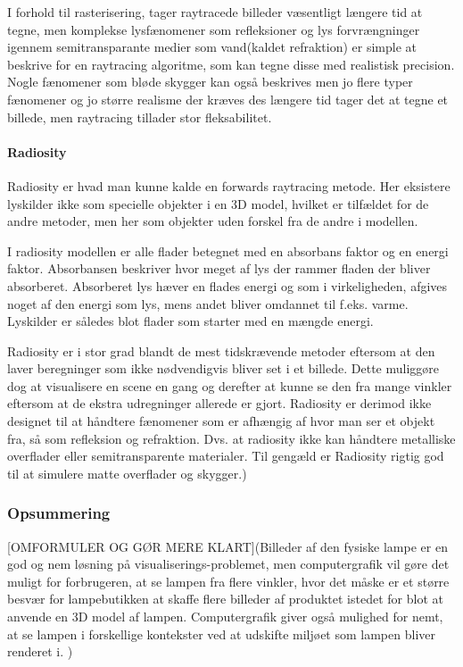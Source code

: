 I forhold til rasterisering, tager raytracede billeder væsentligt længere tid at tegne, men komplekse lysfænomener som refleksioner og lys forvrængninger igennem semitransparante medier som vand(kaldet refraktion) er simple at beskrive for en raytracing algoritme, som kan tegne disse med realistisk precision. Nogle fænomener som bløde skygger kan også beskrives men jo flere typer fænomener og jo større realisme der kræves des længere tid tager det at tegne et billede, men raytracing tillader stor fleksabilitet.

\paragraph{Radiosity \cite{radiosity_by_wpi,radiosity_by_uob}}
Radiosity er hvad man kunne kalde en forwards raytracing metode. Her eksistere lyskilder ikke som specielle objekter i en 3D model, hvilket er tilfældet for de andre metoder, men her som objekter uden forskel fra de andre i modellen.

I radiosity modellen er alle flader betegnet med en absorbans faktor og en energi faktor. Absorbansen beskriver hvor meget af lys der rammer fladen der bliver absorberet. Absorberet lys hæver en flades energi og som i virkeligheden, afgives noget af den energi som lys, mens andet bliver omdannet til f.eks. varme. Lyskilder er således blot flader som starter med en mængde energi.

Radiosity er i stor grad blandt de mest tidskrævende metoder eftersom at den laver beregninger som ikke nødvendigvis bliver set i et billede. Dette muliggøre dog at visualisere en scene en gang og derefter at kunne se den fra mange vinkler eftersom at de ekstra udregninger allerede er gjort. Radiosity er derimod ikke designet til at håndtere fænomener som er afhængig af hvor man ser et objekt fra, så som refleksion og refraktion. Dvs. at radiosity ikke kan håndtere metalliske overflader eller semitransparente materialer. Til gengæld er Radiosity rigtig god til at simulere matte overflader og skygger.)

\subsubsection*{Opsummering}
[OMFORMULER OG GØR MERE KLART](Billeder af den fysiske lampe er en god og nem løsning på visualiserings-problemet, men computergrafik vil gøre det muligt for forbrugeren, at se lampen fra flere vinkler, hvor det måske er et større besvær for lampebutikken at skaffe flere billeder af produktet istedet for blot at anvende en 3D model af lampen. Computergrafik giver også mulighed for nemt, at se lampen i forskellige kontekster ved at udskifte miljøet som lampen bliver renderet i. )

